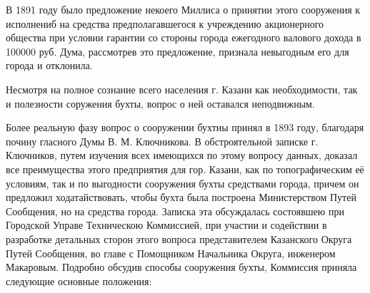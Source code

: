 \documentclass[oneside,final,14pt]{extreport}
\begin{document}
В 1891 году было предложение некоего Миллиса о принятии этого сооружения к исполнениб на средства предполагавшегося к учреждению акционерного общества при условии гарантии со стороны города ежегодного валового дохода в 100000 руб. Дума, рассмотрев это предложение, признала невыгодным его для города и отклонила.

Несмотря на полное сознание всего населения г. Казани как необходимости, так и полезности соружения бухты, вопрос о ней оставался неподвижным.

Более реальную фазу вопрос о сооружении бухтиы принял в 1893 году, благодаря почину гласного Думы В. М. Ключникова. В обстроятельной записке г. Ключников, путем изучения всех имеющихся по этому вопросу данных, доказал все преимущества этого предприятия для гор. Казани, как по топографическим её условиям, так и по выгодности сооружения бухты средствами города, причем он предложил ходатайствовать, чтобы бухта была построена Министерством Путей Сообщения, но на средства города. Записка эта обсуждалась состоявшею при Городской Управе Техническою Коммиссией, при участии и содействии в разработке детальных сторон этого вопроса представителем Казанского Округа Путей Сообщения, во главе с Помощником Начальника Округа, инженером Макаровым. Подробно обсудив способы сооружения бухты, Коммиссия приняла следующие основные положения: 
\end{document}
